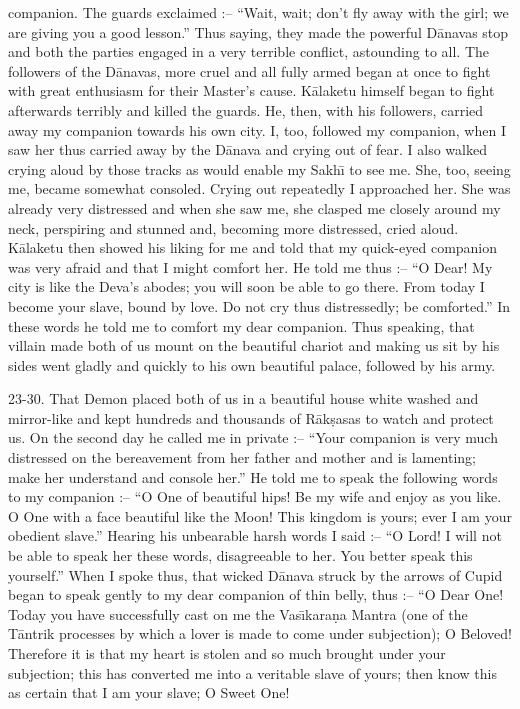 companion. The guards exclaimed :-- ``Wait, wait; don't fly away with the girl; we are giving you a good lesson.'' Thus saying, they made the powerful D\=anavas stop and both the parties engaged in a very terrible conflict, astounding to all. The followers of the D\=anavas, more cruel and all fully armed began at once to fight with great enthusiasm for their Master's cause. K\=alaketu himself began to fight afterwards terribly and killed the guards. He, then, with his followers, carried away my companion towards his own city. I, too, followed my companion, when I saw her thus carried away by the D\=anava and crying out of fear. I also walked crying aloud by those tracks as would enable my Sakh\={\i} to see me. She, too, seeing me, became somewhat consoled. Crying out repeatedly I approached her. She was already very distressed and when she saw me, she clasped me closely around my neck, perspiring and stunned and, becoming more distressed, cried aloud. K\=alaketu then showed his liking for me and told that my quick-eyed companion was very afraid and that I might comfort her. He told me thus :-- ``O Dear! My city is like the Deva's abodes; you will soon be able to go there. From today I become your slave, bound by love. Do not cry thus distressedly; be comforted.'' In these words he told me to comfort my dear companion. Thus speaking, that villain made both of us mount on the beautiful chariot and making us sit by his sides went gladly and quickly to his own beautiful palace, followed by his army.

23-30. That Demon placed both of us in a beautiful house white washed and mirror-like and kept hundreds and thousands of R\=ak\d{s}asas to watch and protect us. On the second day he called me in private :-- ``Your companion is very much distressed on the bereavement from her father and mother and is lamenting; make her understand and console her.'' He told me to speak the following words to my companion :-- ``O One of beautiful hips! Be my wife and enjoy as you like. O One with a face beautiful like the Moon! This kingdom is yours; ever I am your obedient slave.'' Hearing his unbearable harsh words I said :-- ``O Lord! I will not be able to speak her these words, disagreeable to her. You better speak this yourself.'' When I spoke thus, that wicked D\=anava struck by the arrows of Cupid began to speak gently to my dear companion of thin belly, thus :-- ``O Dear One! Today you have successfully cast on me the Vas\={\i}kara\d{n}a Mantra (one of the T\=antrik processes by which a lover is made to come under subjection); O Beloved! Therefore it is that my heart is stolen and so much brought under your subjection; this has converted me into a veritable slave of yours; then know this as certain that I am your slave; O Sweet One!

